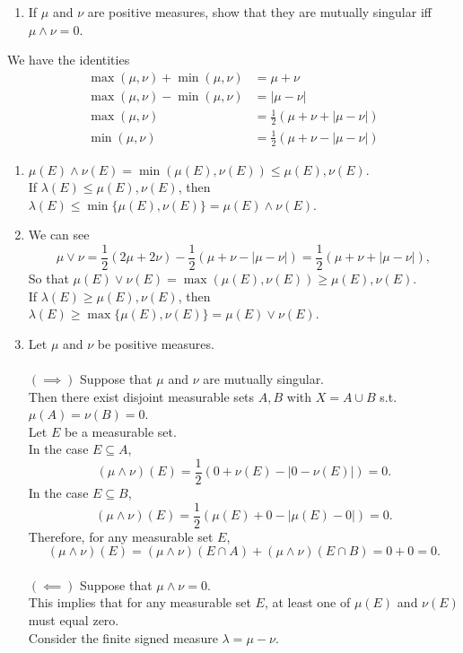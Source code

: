 \begin{enumerate}
\begin{enumerate}[label=(\roman*),align=left]
		\item If $\mu$ and $\nu$ are positive measures, show that they are mutually singular iff $\mu\land\nu=0$.\\
	\end{enumerate}
	We have the identities
	\begin{align*}
		\max(\mu,\nu)+\min(\mu,\nu)&=\mu+\nu\\
		\max(\mu,\nu)-\min(\mu,\nu)&=|\mu-\nu|\\
		\max(\mu,\nu)&=\frac{1}{2}(\mu+\nu+|\mu-\nu|)\\
		\min(\mu,\nu)&=\frac{1}{2}(\mu+\nu-|\mu-\nu|)
	\end{align*}
	\begin{enumerate}[label=(\roman*),align=left]  
		\item $\mu(E)\land\nu(E)=\min(\mu(E),\nu(E))\le\mu(E),\nu(E)$.
		\\If $\lambda(E)\le\mu(E),\nu(E)$, then $\lambda(E)\le\min\{\mu(E),\nu(E)\}=\mu(E)\land\nu(E)$.
		\item We can see
		\[
			\mu\lor\nu=\frac{1}{2}(2\mu+2\nu)-\frac{1}{2}(\mu+\nu-|\mu-\nu|)=\frac{1}{2}(\mu+\nu+|\mu-\nu|),
		\]
		So that $\mu(E)\lor\nu(E)=\max(\mu(E),\nu(E))\ge\mu(E),\nu(E)$.
		\\If $\lambda(E)\ge\mu(E),\nu(E)$, then $\lambda(E)\ge\max\{\mu(E),\nu(E)\}=\mu(E)\lor\nu(E)$.
		\item Let $\mu$ and $\nu$ be positive measures.\\
		\\$(\implies)$ Suppose that $\mu$ and $\nu$ are mutually singular.
		\\Then there exist disjoint measurable sets $A,B$ with $X=A\cup B$ s.t. $\mu(A)=\nu(B)=0$.
		\\Let $E$ be a measurable set.
		\\In the case $E\subseteq A$,
		\[
			(\mu\land\nu)(E)=\frac{1}{2}(0+\nu(E)-|0-\nu(E)|)=0.
		\]
		In the case $E\subseteq B$,
		\[
			(\mu\land\nu)(E)=\frac{1}{2}(\mu(E)+0-|\mu(E)-0|)=0.
		\]
		Therefore, for any measurable set $E$,
		\[
			(\mu\land\nu)(E)=(\mu\land\nu)(E\cap A)+(\mu\land\nu)(E\cap B)=0+0=0.
		\]
		\\$(\impliedby)$ Suppose that $\mu\land\nu=0$.
		\\This implies that for any measurable set $E$, at least one of $\mu(E)$ and $\nu(E)$ must equal zero. 
		\\Consider the finite signed measure $\lambda=\mu-\nu$. 

\end{enumerate}
\end{enumerate}
